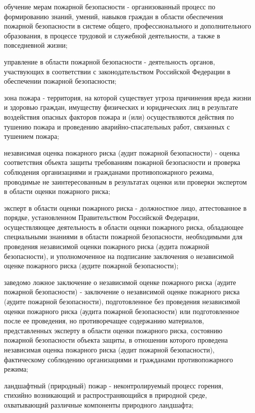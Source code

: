 \documentclass[a4paper, 12pt]{article}
\theoremstyle{definition}
\begin{document}
        обучение мерам пожарной безопасности - организованный процесс по формированию знаний, умений, навыков граждан в области обеспечения пожарной безопасности в системе общего, профессионального и дополнительного образования, в процессе трудовой и служебной деятельности, а также в повседневной жизни;

        управление в области пожарной безопасности - деятельность органов, участвующих в соответствии с законодательством Российской Федерации в обеспечении пожарной безопасности;

        зона пожара - территория, на которой существует угроза причинения вреда жизни и здоровью граждан, имуществу физических и юридических лиц в результате воздействия опасных факторов пожара и (или) осуществляются действия по тушению пожара и проведению аварийно-спасательных работ, связанных с тушением пожара;

        независимая оценка пожарного риска (аудит пожарной безопасности) - оценка соответствия объекта защиты требованиям пожарной безопасности и проверка соблюдения организациями и гражданами противопожарного режима, проводимые не заинтересованным в результатах оценки или проверки экспертом в области оценки пожарного риска;

        эксперт в области оценки пожарного риска - должностное лицо, аттестованное в порядке, установленном Правительством Российской Федерации, осуществляющее деятельность в области оценки пожарного риска, обладающее специальными знаниями в области пожарной безопасности, необходимыми для проведения независимой оценки пожарного риска (аудита пожарной безопасности), и уполномоченное на подписание заключения о независимой оценке пожарного риска (аудите пожарной безопасности);

        заведомо ложное заключение о независимой оценке пожарного риска (аудите пожарной безопасности) - заключение о независимой оценке пожарного риска (аудите пожарной безопасности), подготовленное без проведения независимой оценки пожарного риска (аудита пожарной безопасности) или подготовленное после ее проведения, но противоречащее содержанию материалов, представленных эксперту в области оценки пожарного риска, состоянию пожарной безопасности объекта защиты, в отношении которого проведена независимая оценка пожарного риска (аудит пожарной безопасности), фактическому соблюдению организациями и гражданами противопожарного режима;

        ландшафтный (природный) пожар - неконтролируемый процесс горения,\\ стихийно возникающий и распространяющийся в природной среде, охватывающий различные компоненты природного ландшафта;
\end{document}
